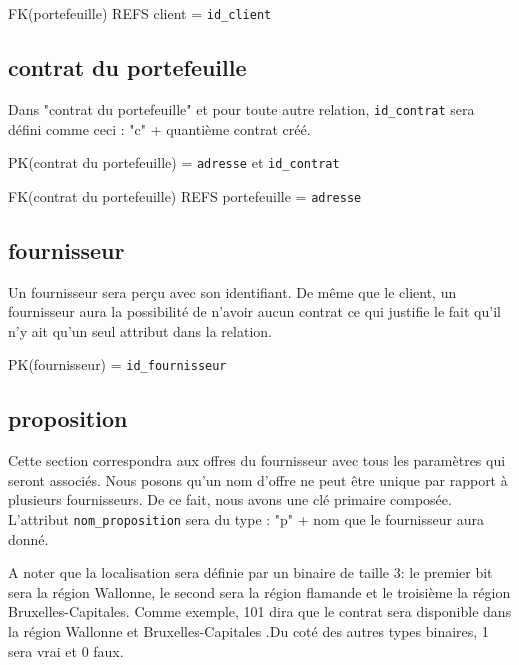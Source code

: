 \begin{flushleft}
FK(portefeuille) REFS client = \texttt{id\_client}
\end{flushleft}
\subsection{contrat du portefeuille}
\begin{flushleft}
 Dans "contrat du portefeuille" et pour toute autre relation, \texttt{id\_contrat} sera défini comme ceci : "c" + quantième contrat créé.
\end{flushleft}

\begin{flushleft}
PK(contrat du portefeuille) = \texttt{adresse} et \texttt{id\_contrat}
\end{flushleft}

\begin{flushleft}
FK(contrat du portefeuille) REFS portefeuille = \texttt{adresse}
\end{flushleft}
\subsection{fournisseur}
\begin{flushleft}
Un fournisseur sera perçu avec son identifiant. De même que le client, un fournisseur aura la possibilité de n'avoir aucun contrat ce qui justifie le fait qu'il n'y ait qu'un seul attribut dans la relation.
\end{flushleft}

\begin{flushleft}
PK(fournisseur) = \texttt{id\_fournisseur}
\end{flushleft}
\subsection{proposition}
\begin{flushleft}
Cette section correspondra aux offres du fournisseur avec tous les paramètres qui seront associés. Nous posons qu'un nom d'offre ne peut être unique par rapport à plusieurs fournisseurs. De ce fait, nous avons une clé primaire composée. L'attribut \texttt{nom\_proposition} sera du type : "p" + nom que le fournisseur aura donné.
\end{flushleft}

\begin{flushleft}
A noter que la localisation sera définie par un binaire de taille 3: le premier bit sera la région Wallonne, le second sera la région flamande et le troisième la région Bruxelles-Capitales. Comme exemple, 101 dira que le contrat sera disponible dans la région Wallonne et Bruxelles-Capitales .Du coté des autres types binaires, 1 sera vrai et 0 faux. 
\end{flushleft}

